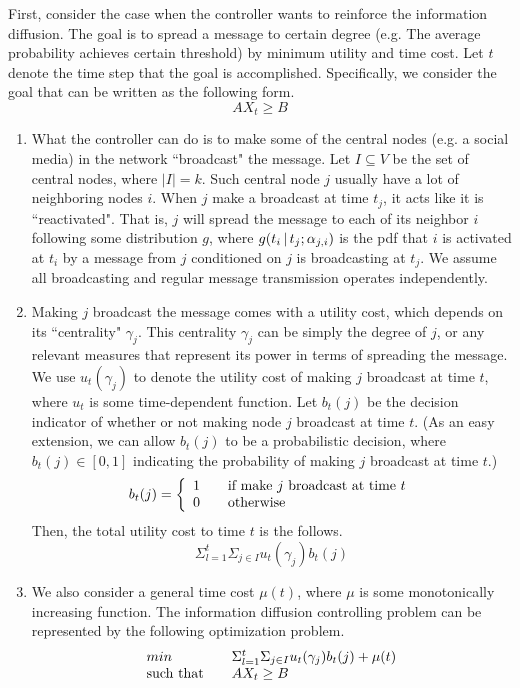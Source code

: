 \documentclass[11pt]{article}
\begin{document}
First, consider the case when the controller wants to reinforce the information diffusion. The goal is to spread a message to certain degree (e.g. The average probability achieves certain threshold) by minimum utility and time cost. Let $t$ denote the time step that the goal is accomplished. Specifically, we consider the goal that can be written as the following form.
\begin{equation}
AX_{t} \geq B
\end{equation} 
\begin{enumerate}
\item What the controller can do is to make some of the central nodes (e.g. a social media) in the network ``broadcast" the message. Let $I \subseteq V$ be the set of central nodes, where $|I|=k$. Such central node $j$ usually have a lot of neighboring nodes $i$. When $j$ make a broadcast at time $t_{j}$, it acts like it is ``reactivated". That is, $j$ will spread the message to each of its neighbor $i$ following some distribution $g$, where $g(t_{i}\,|\, t_{j} ; \alpha_{j,i})$ is the pdf that $i$ is activated at $t_{i}$ by a message from $j$ conditioned on $j$ is broadcasting at $t_{j}$. We assume all broadcasting and regular message transmission operates independently.
\item Making $j$ broadcast the message comes with a utility cost, which depends on its ``centrality" $\gamma_{j}$. This centrality $\gamma_{j}$ can be simply the degree of $j$, or any relevant measures that represent its power in terms of spreading the message. We use $u_{t}(\gamma_{j})$ to denote the utility cost of making $j$ broadcast at time $t$, where $u_{t}$ is some time-dependent function. Let $b_{t}(j)$ be the decision indicator of whether or not making node $j$ broadcast at time $t$. (As an easy extension, we can allow $b_{t}(j)$ to be a probabilistic decision, where $b_{t}(j) \in [0,1]$ indicating the probability of making $j$ broadcast at time $t$.)
\[ b_{t}(j) = \left\{ 
  \begin{array}{l l}
    1 & \quad \text{if make $j$ broadcast at time $t$}\\
    0 & \quad \text{otherwise}
  \end{array} \right.\]
Then, the total utility cost to time $t$ is the follows.
\begin{equation}
\Sigma_{l=1}^{t} \Sigma_{j \in I} u_{t}(\gamma_{j})b_{t}(j)
\end{equation}
\item We also consider a general time cost $\mu(t)$, where $\mu$ is some monotonically increasing function. The information diffusion controlling problem can be represented by the following optimization problem.
\[
\begin{array}{l l}
    min & \quad \Sigma_{l=1}^{t} \Sigma_{j \in I} u_{t}(\gamma_{j})b_{t}(j) + \mu(t)\\
    \text{such that} & \quad AX_{t} \geq B
  \end{array}
\]
\end{enumerate}
\end{document}
